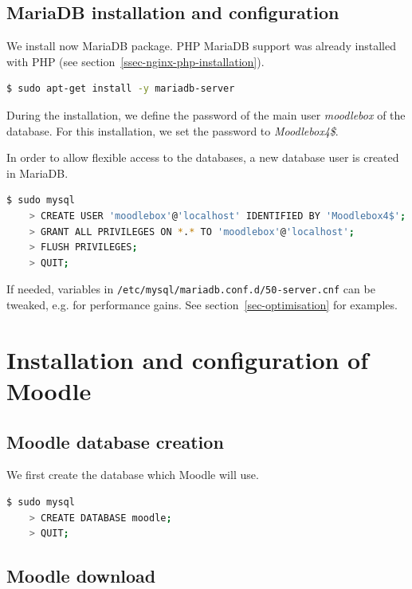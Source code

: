 \documentclass[12pt]{article}
\begin{document}
\subsection{MariaDB installation and configuration}

We install now MariaDB package.
PHP MariaDB support was already installed with PHP (see section~\ref{ssec-nginx-php-installation}).
\begin{lstlisting}[language=bash]
$ sudo apt-get install -y mariadb-server
\end{lstlisting}

During the installation, we define the password of the main user \emph{moodlebox} of the database.
For this installation, we set the password to \emph{Moodlebox4\$}.

In order to allow flexible access to the databases, a new database user is created in MariaDB.

\begin{lstlisting}[language=bash]
$ sudo mysql
    > CREATE USER 'moodlebox'@'localhost' IDENTIFIED BY 'Moodlebox4$';
    > GRANT ALL PRIVILEGES ON *.* TO 'moodlebox'@'localhost';
    > FLUSH PRIVILEGES;
    > QUIT;
\end{lstlisting}

If needed, variables in \lstinline{/etc/mysql/mariadb.conf.d/50-server.cnf} can be tweaked, e.g. for performance gains. See section~\ref{sec-optimisation} for examples.

\section{Installation and configuration of Moodle}

\subsection{Moodle database creation}

We first create the database which Moodle will use.
\begin{lstlisting}[language=bash]
$ sudo mysql
    > CREATE DATABASE moodle;
    > QUIT;
\end{lstlisting}

\subsection{Moodle download}
\end{document}
